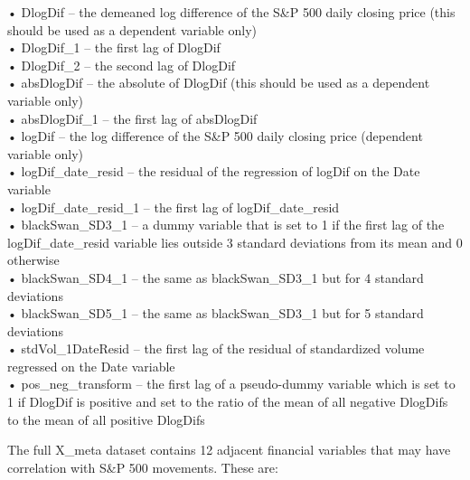 \documentclass[11pt,preprint, authoryear]{elsarticle}
\numberwithin{equation}{section}
\numberwithin{figure}{section}
\numberwithin{table}{section}
\begin{document}
• DlogDif -- the demeaned log difference of the S\&P 500 daily closing
price (this should be used as a dependent variable only)\\
• DlogDif\_1 -- the first lag of DlogDif\\
• DlogDif\_2 -- the second lag of DlogDif\\
• absDlogDif -- the absolute of DlogDif (this should be used as a
dependent variable only)\\
• absDlogDif\_1 -- the first lag of absDlogDif\\
• logDif -- the log difference of the S\&P 500 daily closing price
(dependent variable only)\\
• logDif\_date\_resid -- the residual of the regression of logDif on the
Date variable\\
• logDif\_date\_resid\_1 -- the first lag of logDif\_date\_resid\\
• blackSwan\_SD3\_1 -- a dummy variable that is set to 1 if the first
lag of the logDif\_date\_resid variable lies outside 3 standard
deviations from its mean and 0 otherwise\\
• blackSwan\_SD4\_1 -- the same as blackSwan\_SD3\_1 but for 4 standard
deviations\\
• blackSwan\_SD5\_1 -- the same as blackSwan\_SD3\_1 but for 5 standard
deviations\\
• stdVol\_1DateResid -- the first lag of the residual of standardized
volume regressed on the Date variable\\
• pos\_neg\_transform -- the first lag of a pseudo-dummy variable which
is set to 1 if DlogDif is positive and set to the ratio of the mean of
all negative DlogDifs to the mean of all positive DlogDifs

The full X\_meta dataset contains 12 adjacent financial variables that
may have correlation with S\&P 500 movements. These are:
\end{document}
